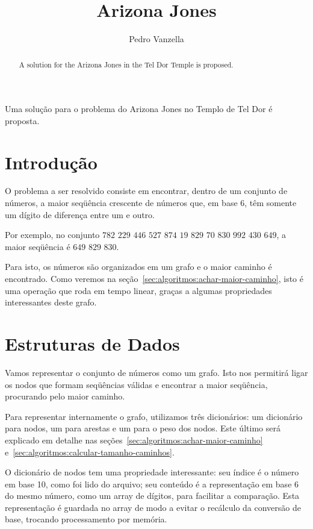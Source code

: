 \documentclass[12pt]{article}
\title{Arizona Jones}
\author{Pedro Vanzella\inst{1}}
\begin{document}
\maketitle
\begin{abstract}
  A solution for the Arizona Jones in the Tel Dor Temple is proposed.
\end{abstract}
\begin{resumo}
  Uma solu\c{c}ão para o problema do Arizona Jones no Templo de Tel Dor é proposta.
\end{resumo}


\section{Introdução}\label{sec:intro}

O problema a ser resolvido consiste em encontrar, dentro de um conjunto de números, a maior seqüência crescente de números que, em base 6, têm somente um dígito de diferen\c{c}a entre um e outro. 

Por exemplo, no conjunto $782$ $229$ $446$ $527$ $874$ $19$ $829$ $70$ $830$ $992$ $430$ $649$, a maior seqüência é $649$ $829$ $830$.

Para isto, os números são organizados em um grafo e o maior caminho é encontrado. Como veremos na se\c{c}ão~\ref{sec:algoritmos:achar-maior-caminho}, isto é uma opera\c{c}ão que roda em tempo linear, gra\c{c}as a algumas propriedades interessantes deste grafo.

\section{Estruturas de Dados}\label{sec:estruturas}
Vamos representar o conjunto de números como um grafo. Isto nos permitirá ligar os nodos que formam seqüências válidas e encontrar a maior seqüência, procurando pelo maior caminho.

Para representar internamente o grafo, utilizamos três dicionários: um dicionário para nodos, um para arestas e um para o peso dos nodos. Este último será explicado em detalhe nas se\c{c}ões~\ref{sec:algoritmos:achar-maior-caminho} e~\ref{sec:algoritmos:calcular-tamanho-caminhos}.

O dicionário de nodos tem uma propriedade interessante: seu índice é o número em base 10, como foi lido do arquivo; seu conteúdo é a representa\c{c}ão em base 6 do mesmo número, como um array de dígitos, para facilitar a compara\c{c}ão. Esta representa\c{c}ão é guardada no array de modo a evitar o recálculo da conversão de base, trocando processamento por memória.
\end{document}
